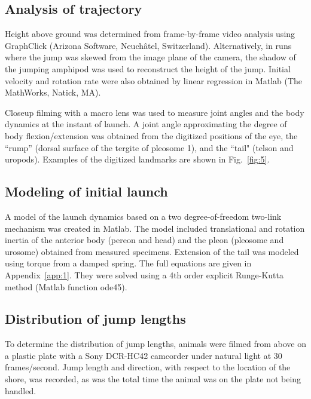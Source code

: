 \documentclass{article}
\begin{document}
\subsection*{Analysis of trajectory}
	Height above ground was determined from frame-by-frame video analysis using GraphClick (Arizona Software, Neuch\^{a}tel, Switzerland).  Alternatively, in runs where the jump was skewed from the image plane of the camera, the shadow of the jumping amphipod was used to reconstruct the height of the jump.  Initial velocity and rotation rate were also obtained by linear regression in Matlab (The MathWorks, Natick, MA).  

Closeup filming with a macro lens was used to measure joint angles and the body dynamics at the instant of launch.  A joint angle approximating the degree of body flexion/extension was obtained from the digitized positions of the eye, the ``rump'' (dorsal surface of the tergite of pleosome 1), and the ``tail" (telson and uropods).  Examples of the digitized landmarks are shown in Fig.~\ref{fig:5}.


\subsection*{Modeling of initial launch}
	A model of the launch dynamics based on a two degree-of-freedom two-link mechanism was created in Matlab.  The model included translational and rotation inertia of the anterior body (pereon and head) and the pleon (pleosome and urosome) obtained from measured specimens.  Extension of the tail was modeled using torque from a damped spring.  The full equations are given in Appendix~\ref{app:1}.  They were solved using a 4th order explicit Runge-Kutta method (Matlab function ode45). 

\subsection*{Distribution of jump lengths}
	To determine the distribution of jump lengths, animals were filmed from above on a plastic plate with a Sony DCR-HC42 camcorder under natural light at 30 frames/second.  Jump length and direction, with respect to the location of the shore, was recorded, as was the total time the animal was on the plate not being handled.
\end{document}
